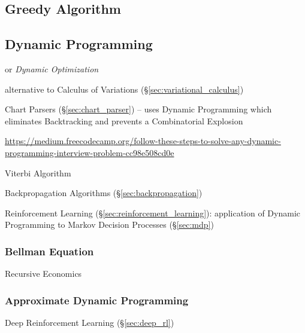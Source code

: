 \subsection{Greedy Algorithm}\label{sec:greedy_algorithm}

\subsection{Dynamic Programming}\label{sec:dynamic_programming}

or \emph{Dynamic Optimization}

alternative to Calculus of Variations (\S\ref{sec:variational_calculus})

\fist Chart Parsers (\S\ref{sec:chart_parser}) -- uses Dynamic Programming which
eliminates Backtracking and prevents a Combinatorial Explosion

\url{https://medium.freecodecamp.org/follow-these-steps-to-solve-any-dynamic-programming-interview-problem-cc98e508cd0e}

Viterbi Algorithm

Backpropagation Algorithms (\S\ref{sec:backpropagation})

\fist Reinforcement Learning (\S\ref{sec:reinforcement_learning}): application
of Dynamic Programming to Markov Decision Processes (\S\ref{sec:mdp})



\subsubsection{Bellman Equation}\label{sec:bellman_equation}

Recursive Economics



\subsubsection{Approximate Dynamic Programming}
\label{sec:approximate_dynamic_programming}

\fist Deep Reinforcement Learning (\S\ref{sec:deep_rl})



